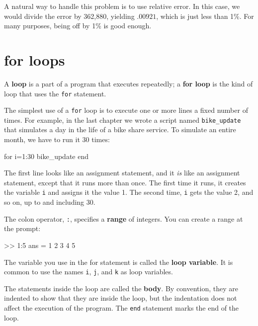 \documentclass[main.tex]{subfiles}
\begin{document}
A natural way to handle this problem is to use relative
error.
In this case, we would divide the error
by 362,880, yielding $.00921$, which is just less than 1\%.
For many purposes, being off by 1\% is good enough.


\section{for loops}


A {\bf loop} is a part of a program that executes repeatedly;
a {\bf for loop} is the kind of loop that uses the {\tt for}
statement.

The simplest use of a {\tt for} loop is to execute one or more
lines a fixed number of times.
For example, in the last chapter
we wrote a script named \verb"bike_update" that simulates a
day in the life of a bike share service.  To simulate an entire
month, we have to run it 30 times:

\begin{code}
for i=1:30
    bike_update
end
\end{code}

The first line looks like an assignment statement, and it {\em is}
like an assignment statement, except that it runs more than once.  The
first time it runs, it creates the variable {\tt i} and assigns it the
value 1.  The second time, {\tt i} gets the value 2, and so on, up to
and including 30.


The colon operator, {\tt :}, specifies a {\bf range} of integers.
You can create a range at the prompt:

\begin{code}
>> 1:5
ans =  1     2     3     4     5
\end{code}

The variable you use in the for statement is called the {\bf loop
variable}.  It is common to use the names {\tt i},
{\tt j}, and {\tt k} as loop variables.


The statements inside the loop are called the {\bf body}.  By convention,
they are indented to show that they are inside the loop, but the
indentation does not affect the execution of the program.
The {\tt end} statement marks the end of the loop.
\end{document}
